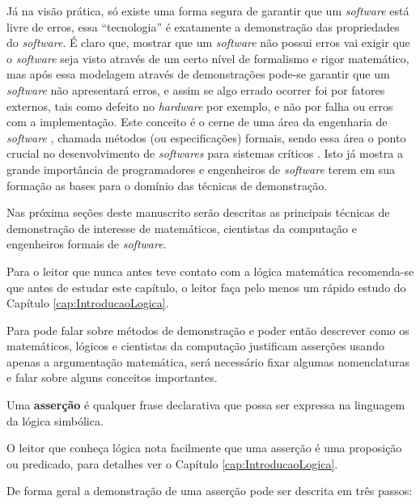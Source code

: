 Já na visão prática, só existe uma forma segura de garantir que um \textit{software} está livre de erros, essa ``tecnologia'' é exatamente a demonstração das propriedades do \textit{software}. É claro que, mostrar que um \textit{software} não possui erros vai exigir que o \textit{software} seja visto através de um certo nível de formalismo e rigor matemático, mas após essa modelagem através de demonstrações pode-se garantir que um \textit{software} não apresentará erros, e assim se algo errado ocorrer foi por fatores externos, tais como defeito no \textit{hardware} por exemplo, e não por falha ou erros com a implementação. Este conceito é o cerne de uma área da engenharia de \textit{software} \cite{pressman2016}, chamada métodos  (ou especificações) formais, sendo essa área o ponto crucial no desenvolvimento de \textit{softwares} para sistemas críticos \cite{sommerville2011}. Isto já mostra a grande importância de programadores e engenheiros de \textit{software} terem em sua formação as bases para o domínio das técnicas de demonstração.

Nas próxima seções deste manuscrito serão descritas as principais técnicas de demonstração de interesse de matemáticos, cientistas da computação e engenheiros formais de \textit{software}. 

\begin{remark}
	Para o leitor que nunca antes teve contato com a lógica matemática recomenda-se que antes de estudar este capítulo, o leitor faça pelo menos um rápido estudo do Capítulo \ref{cap:IntroducaoLogica}.
\end{remark}

Para pode falar sobre métodos de demonstração e poder então descrever como os matemáticos, lógicos e cientistas da computação justificam asserções usando apenas a argumentação matemática, será necessário fixar algumas nomenclaturas e falar sobre alguns conceitos importantes.

\begin{definition}[Asserção]\label{def:Assercao}
	Uma \textbf{asserção} é qualquer frase declarativa que possa ser expressa na linguagem da lógica simbólica.
\end{definition}

\begin{remark}
	O leitor que conheça lógica nota facilmente que uma asserção é uma proposição ou predicado, para detalhes ver o Capítulo \ref{cap:IntroducaoLogica}.
\end{remark}

De forma geral a demonstração de uma asserção pode ser descrita em três passos:

